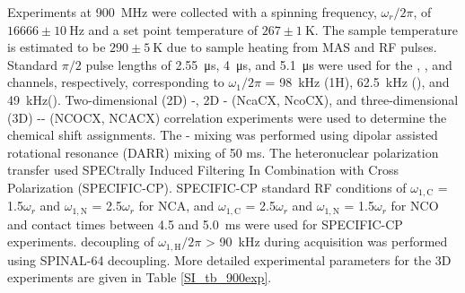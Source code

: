 \documentclass[%
 aip,
 amsmath,amssymb,
 preprint,%
]{revtex4-1}
\begin{document}
Experiments at \SI{900}{\mega\hertz} were collected with a spinning frequency, $\omega_{r}/2\pi$, of $16666\pm\SI{10}{\hertz}$ and a set point temperature of $267\pm\SI{1}{\kelvin}$. The sample temperature is estimated to be $290\pm \SI{5}{\kelvin}$ due to sample heating from MAS and RF pulses.\cite{Zhang2019} Standard $\pi/2$ pulse lengths of \SI{2.55}{\micro\second}, \SI{4}{\micro\second}, and \SI{5.1}{\micro\second} were used for the , , and  channels, respectively, corresponding to $\omega_1/2\pi$ = \SI{98}{\kilo\hertz} (1H), \SI{62.5}{\kilo\hertz} (), and \SI{49}{\kilo\hertz}(). Two-dimensional (2D) -, 2D - (NcaCX, NcoCX), and three-dimensional (3D) -- (NCOCX, NCACX) correlation experiments were used to determine the chemical shift assignments.\cite{Pauli2001,Igumenova2004,Li2007} The - mixing was performed using dipolar assisted rotational resonance (DARR) mixing of 50 ms.\cite{Takegoshi2001} The heteronuclear polarization transfer used SPECtrally Induced Filtering In Combination with Cross Polarization (SPECIFIC-CP).\cite{Baldus1998} SPECIFIC-CP standard RF conditions of $\omega_{1,\text{C}}$ = 1.5$\omega_{r}$ and $\omega_{1,\text{N}}$ = 2.5$\omega_{r}$ for NCA, and $\omega_{1,\text{C}}$ = 2.5$\omega_{r}$ and $\omega_{1,\text{N}}$ = 1.5$\omega_{r}$ for NCO and contact times between 4.5 and \SI{5.0}{\milli\second} were used for SPECIFIC-CP experiments.  decoupling of $\omega_{1,\text{H}}/2\pi$ > \SI{90}{\kilo\hertz} during acquisition was performed using SPINAL-64 decoupling.\cite{Fung2000} More detailed experimental parameters for the 3D experiments are given in Table \ref{SI_tb_900exp}. 
\end{document}
